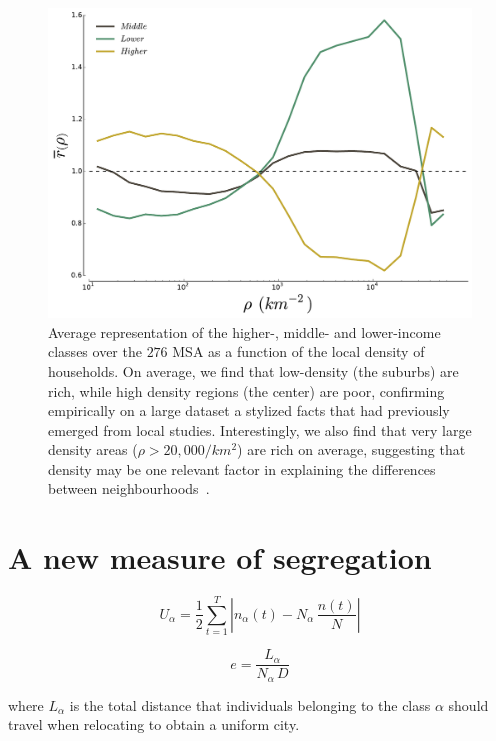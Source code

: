 \begin{figure}
    \centering
    \includegraphics[width=\textwidth]{gfx/chapter-segregation/figure4.pdf}
    \caption{Average representation of the higher-, middle- and
      lower-income classes over the $276$ MSA as a function of the
      local density of households. On average, we find that low-density (the
  suburbs) are rich, while high density regions (the center) are poor,
  confirming empirically on a large dataset a stylized facts that had previously
  emerged from local studies. Interestingly, we also
  find that  very large density areas ($\rho>20,000/km^2$) are rich on average,
  suggesting that density may be one relevant factor in explaining the
  differences between neighbourhoods~\cite{Jacobs:1961}.
  \label{fig:high_low_densities}} 
  \end{figure}

\section{A new measure of segregation}
\label{sec:a_new_measure_of_segregation}

\begin{equation}
    U_\alpha = \frac{1}{2} \sum_{t=1}^T \left| n_\alpha(t) -
    N_\alpha\,\frac{n(t)}{N}\right|
\end{equation}

\begin{equation}
    e = \frac{L_\alpha}{N_\alpha\,D}
\end{equation}

where $L_\alpha$ is the total distance that individuals belonging to the class
$\alpha$ should travel when relocating to obtain a uniform city.
